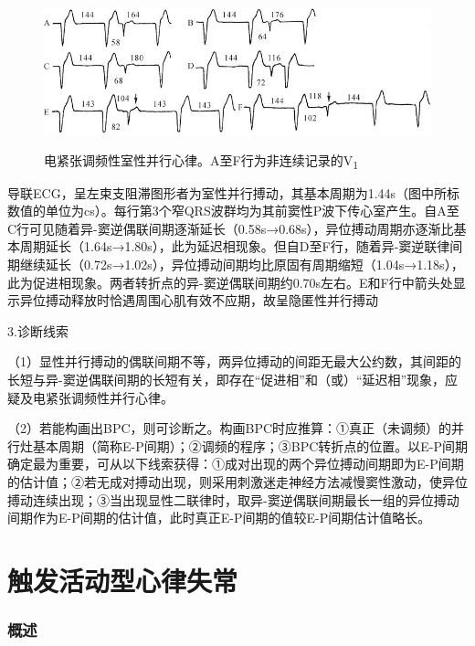 \begin{figure}[!htbp]
 \centering
 \includegraphics[width=5.3125in,height=1.73958in]{./images/Image00299.jpg}
 \captionsetup{justification=centering}
 \caption{电紧张调频性室性并行心律。A至F行为非连续记录的V\textsubscript{1}}
 \label{fig16-23}
  \end{figure} 
导联ECG，呈左束支阻滞图形者为室性并行搏动，其基本周期为1.44s（图中所标数值的单位为cs）。每行第3个窄QRS波群均为其前窦性P波下传心室产生。自A至C行可见随着异-窦逆偶联间期逐渐延长（0.58s→0.68s），异位搏动周期亦逐渐比基本周期延长（1.64s→1.80s），此为延迟相现象。但自D至F行，随着异-窦逆联律间期继续延长（0.72s→1.02s），异位搏动间期均比原固有周期缩短（1.04s→1.18s），此为促进相现象。两者转折点的异-窦逆偶联间期约0.70s左右。E和F行中箭头处显示异位搏动释放时恰遇周围心肌有效不应期，故呈隐匿性并行搏动

3.诊断线索

（1）显性并行搏动的偶联间期不等，两异位搏动的间距无最大公约数，其间距的长短与异-窦逆偶联间期的长短有关，即存在“促进相”和（或）“延迟相”现象，应疑及电紧张调频性并行心律。

（2）若能构画出BPC，则可诊断之。构画BPC时应推算：①真正（未调频）的并行灶基本周期（简称E-P间期）；②调频的程序；③BPC转折点的位置。以E-P间期确定最为重要，可从以下线索获得：①成对出现的两个异位搏动间期即为E-P间期的估计值；②若无成对搏动出现，则采用刺激迷走神经方法减慢窦性激动，使异位搏动连续出现；③当出现显性二联律时，取异-窦逆偶联间期最长一组的异位搏动间期作为E-P间期的估计值，此时真正E-P间期的值较E-P间期估计值略长。

\protect\hypertarget{text00024.html}{}{}

\protect\hypertarget{text00024.htmlux5cux23chapter24}{}{}

\chapter{触发活动型心律失常}

\protect\hypertarget{text00024.htmlux5cux23subid302}{}{}

\subsection{概述}

